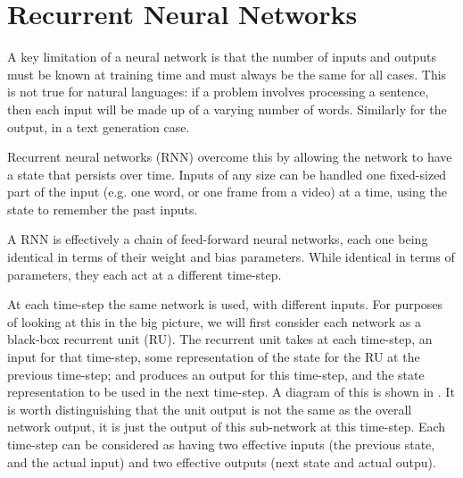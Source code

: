 \documentclass[12pt,parskip]{komatufte}
\begin{document}
\section{Recurrent Neural Networks}


A key limitation of a neural network is that the number of inputs and outputs must be known at training time and must always be the same for all cases.
This is not true for natural languages: if a problem involves processing a sentence, then each input will be made up of a varying number of words. Similarly for the output, in a text generation case.


Recurrent neural networks (RNN) overcome this by allowing the network to have a state that persists over time.
Inputs of any size can be handled one fixed-sized part of the input (e.g. one word, or one frame from a video) at a time, using the state to remember the past inputs.


A RNN is effectively a chain of feed-forward neural networks,
each one being identical in terms of their weight and bias parameters.
While identical in terms of parameters, they each act at a different time-step.



At each time-step the same network is used, with different inputs.
For purposes of looking at this in the big picture, we will first consider each network as a black-box recurrent unit (RU).
The recurrent unit takes at each time-step, an input for that time-step, some representation  of the state for the RU at the previous time-step; and produces an output for this time-step, and the state representation to be used in the next time-step.
A diagram of this is shown in .
It is worth distinguishing that the unit output is not the same as the overall network output, it is just the output of this sub-network at this time-step.
Each time-step can be considered as having two effective inputs (the previous state, and the actual input) and two effective outputs (next state and actual outpu).
\end{document}
